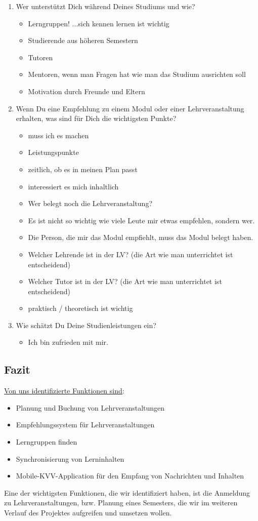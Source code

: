 \documentclass{article}
\begin{document}
\begin{enumerate}
\item Wer unterstützt Dich während Deines Studiums und wie?
\begin{itemize}
\item Lerngruppen! ...sich kennen lernen ist wichtig
\item Studierende aus höheren Semestern
\item Tutoren
\item Mentoren, wenn man Fragen hat wie man das Studium ausrichten soll
\item Motivation durch Freunde und Eltern
\end{itemize}

\item Wenn Du eine Empfehlung zu einem Modul oder einer Lehrveranstaltung erhalten, was sind für Dich die wichtigsten Punkte?
\begin{itemize}
\item muss ich es machen
\item Leistungspunkte
\item zeitlich, ob es in meinen Plan passt
\item interessiert es mich inhaltlich
\item Wer belegt noch die Lehrveranstaltung?
\item Es ist nicht so wichtig wie viele Leute mir etwas empfehlen, sondern wer.
\item Die Person, die mir das Modul empfiehlt, muss das Modul belegt haben.
\item Welcher Lehrende ist in der LV? (die Art wie man unterrichtet ist entscheidend)
\item Welcher Tutor ist in der LV? (die Art wie man unterrichtet ist entscheidend)
\item praktisch / theoretisch ist wichtig
\end{itemize}

\item Wie schätzt Du Deine Studienleistungen ein?
\begin{itemize}
\item Ich bin zufrieden mit mir.
\end{itemize}
\end{enumerate}

\subsection{Fazit}

\underline{Von uns identifizierte Funktionen sind}:
\begin{itemize}
\item Planung und Buchung von Lehrveranstaltungen
\item Empfehlungssystem für Lehrveranstaltungen
\item Lerngruppen finden
\item Synchronisierung von Lerninhalten
\item Mobile-KVV-Application für den Empfang von Nachrichten und Inhalten
\end{itemize}
Eine der wichtigsten Funktionen, die wir identifiziert haben, ist die Anmeldung zu Lehrveranstaltungen, bzw. Planung eines Semesters, die wir im weiteren Verlauf des Projektes aufgreifen und umsetzen wollen.
\end{document}
